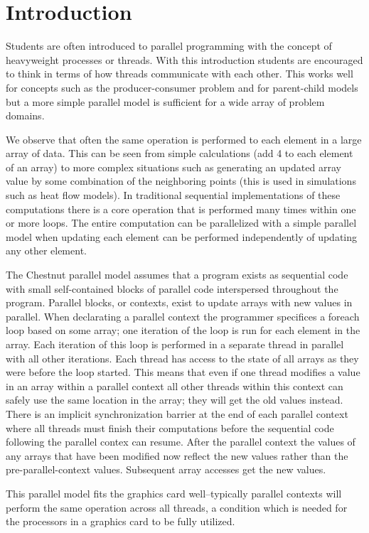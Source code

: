 
\section{Introduction}

Students are often introduced to parallel programming with the concept of heavyweight processes or threads. With this introduction students are encouraged to think in terms of how threads communicate with each other. This works well for concepts such as the producer-consumer problem and for parent-child models but a more simple parallel model is sufficient for a wide array of problem domains.

We observe that often the same operation is performed to each element in a large array of data. This can be seen from simple calculations (add 4 to each element of an array) to more complex situations such as generating an updated array value by some combination of the neighboring points (this is used in simulations such as heat flow models). In traditional sequential implementations of these computations there is a core operation that is performed many times within one or more loops. The entire computation can be parallelized with a simple parallel model when updating each element can be performed independently of updating any other element.

The Chestnut parallel model assumes that a program exists as sequential code with small self-contained blocks of parallel code interspersed throughout the program. Parallel blocks, or contexts, exist to update arrays with new values in parallel. When declarating a parallel context the programmer specifices a foreach loop based on some array; one iteration of the loop is run for each element in the array. Each iteration of this loop is performed in a separate thread in parallel with all other iterations. Each thread has access to the state of all arrays as they were before the loop started. This means that even if one thread modifies a value in an array within a parallel context all other threads within this context can safely use the same location in the array; they will get the old values instead. There is an implicit synchronization barrier at the end of each parallel context where all threads must finish their computations before the sequential code following the parallel contex can resume. After the parallel context the values of any arrays that have been modified now reflect the new values rather than the pre-parallel-context values. Subsequent array accesses get the new values.

This parallel model fits the graphics card well--typically parallel contexts will perform the same operation across all threads, a condition which is needed for the processors in a graphics card to be fully utilized.

